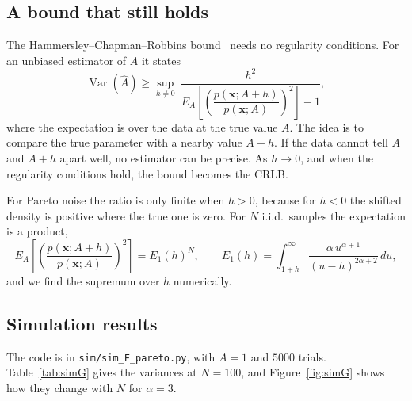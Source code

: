 \documentclass[11pt]{article}
\numberwithin{figure}{section}
\numberwithin{equation}{section}
\begin{document}
\subsection{A bound that still holds}

The Hammersley--Chapman--Robbins bound~\cite{hammersley, chapmanrobbins} needs no regularity
conditions. For an unbiased estimator of $A$ it states
\[
  \operatorname{Var}(\hat A) \geq \sup_{h \neq 0}\ \frac{h^2}{E_A\!\left[\left(\dfrac{p(\mathbf{x}; A + h)}{p(\mathbf{x}; A)}\right)^{2}\right] - 1},
\]
where the expectation is over the data at the true value $A$. The idea is to compare the true
parameter with a nearby value $A + h$. If the data cannot tell $A$ and $A + h$ apart well, no
estimator can be precise. As $h \to 0$, and when the regularity conditions hold, the bound becomes
the CRLB.

For Pareto noise the ratio is only finite when $h > 0$, because for $h < 0$ the shifted density is
positive where the true one is zero. For $N$ i.i.d.\ samples the expectation is a product,
\[
  E_A\!\left[\left(\frac{p(\mathbf{x}; A+h)}{p(\mathbf{x}; A)}\right)^2\right] = E_1(h)^N, \qquad
  E_1(h) = \int_{1+h}^{\infty} \frac{\alpha\,u^{\alpha+1}}{(u - h)^{2\alpha + 2}}\,du ,
\]
and we find the supremum over $h$ numerically.

\subsection{Simulation results}

The code is in \texttt{sim/sim\_F\_pareto.py}, with $A = 1$ and $5000$ trials. Table~\ref{tab:simG}
gives the variances at $N = 100$, and Figure~\ref{fig:simG} shows how they change with $N$ for
$\alpha = 3$.

\begin{table}[H]
\centering
{}
\caption{Variances under Pareto noise at $N = 100$, $5000$ trials. The median's variance is about
its own pseudo-true value.}
\label{tab:simG}
\end{table}
\end{document}
